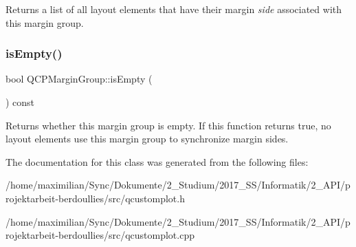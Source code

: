 Returns a list of all layout elements that have their margin {\itshape side} associated with this margin group. \mbox{\label{class_q_c_p_margin_group_ae0d32656d8a5fc5690c4e7693f9d0539}} 
\subsubsection{\texorpdfstring{is\+Empty()}{isEmpty()}}
{\footnotesize\ttfamily bool Q\+C\+P\+Margin\+Group\+::is\+Empty (\begin{DoxyParamCaption}{ }\end{DoxyParamCaption}) const}

Returns whether this margin group is empty. If this function returns true, no layout elements use this margin group to synchronize margin sides. 

The documentation for this class was generated from the following files\+:\begin{DoxyCompactItemize}
\item 
/home/maximilian/\+Sync/\+Dokumente/2\+\_\+\+Studium/2017\+\_\+\+S\+S/\+Informatik/2\+\_\+\+A\+P\+I/projektarbeit-\/berdoullies/src/qcustomplot.\+h\item 
/home/maximilian/\+Sync/\+Dokumente/2\+\_\+\+Studium/2017\+\_\+\+S\+S/\+Informatik/2\+\_\+\+A\+P\+I/projektarbeit-\/berdoullies/src/qcustomplot.\+cpp\end{DoxyCompactItemize}
